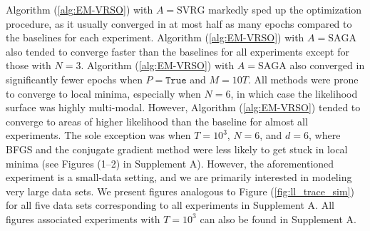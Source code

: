 Algorithm (\ref{alg:EM-VRSO}) with $A=\text{SVRG}$ markedly sped up the optimization procedure, as it usually converged in at most half as many epochs compared to the baselines for each experiment. Algorithm (\ref{alg:EM-VRSO}) with $A=\text{SAGA}$ also tended to converge faster than the baselines for all experiments except for those with $N=3$. Algorithm (\ref{alg:EM-VRSO}) with $A=\text{SAGA}$ also converged in significantly fewer epochs when $P = \texttt{True}$ and $M=10T$. 
%
All methods were prone to converge to local minima, especially when $N=6$, in which case the likelihood surface was highly multi-modal. However, Algorithm (\ref{alg:EM-VRSO}) tended to converge to areas of higher likelihood than the baseline for almost all experiments. The sole exception was when $T=10^3$, $N=6$, and $d=6$, where BFGS and the conjugate gradient method were less likely to get stuck in local minima (see Figures (1--2) in Supplement A). However, the aforementioned experiment is a small-data setting, and we are primarily interested in modeling very large data sets. %
%
%
We present figures analogous to Figure (\ref{fig:ll_trace_sim}) for all five data sets corresponding to all experiments in Supplement A. All figures associated experiments with $T=10^3$ can also be found in Supplement A. 

%



